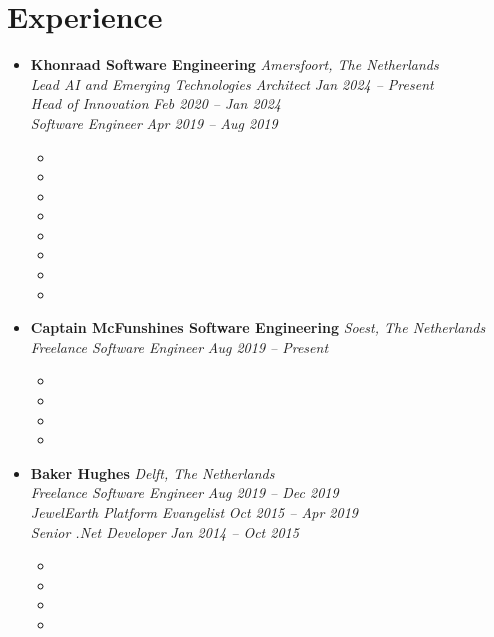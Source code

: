 \documentclass[11pt,a4paper]{article}
\begin{document}
\section{Experience}
\begin{itemize}[leftmargin=0pt,label={},itemsep=2em]  %
\item \textbf{Khonraad Software Engineering} \hfill \textit{Amersfoort, The Netherlands}\\[2pt]
\textit{Lead AI and Emerging Technologies Architect} \hfill \textit{Jan 2024 -- Present}\\[2pt]
\textit{Head of Innovation} \hfill \textit{Feb 2020 -- Jan 2024}\\[2pt]
\textit{Software Engineer} \hfill \textit{Apr 2019 -- Aug 2019}\\[1pt]
\begin{itemize}[leftmargin=*,topsep=0pt,parsep=0pt,partopsep=0pt]
    \item \KhonraadChatbots
    \item \KhonraadLifecycle
    \item \KhonraadMobile
    \item \KhonraadAndroid
    \item \KhonraadMPS
    \item \KhonraadJava
    \item \KhonraadLaws
    \item \KhonraadHaskell
\end{itemize}

\item \textbf{Captain McFunshines Software Engineering} \hfill \textit{Soest, The Netherlands}\\[2pt]
\textit{Freelance Software Engineer} \hfill \textit{Aug 2019 -- Present}\\[1pt]
\begin{itemize}[leftmargin=*,topsep=0pt,parsep=0pt,partopsep=0pt]
    \item \McfunshinePodmorph
    \item \McfunshinePodmorphAI
    \item \McfunshinePodmorphCloud
    \item \McfunshinePodmorphBaker
\end{itemize}

\item \textbf{Baker Hughes} \hfill \textit{Delft, The Netherlands}\\[2pt]
\textit{Freelance Software Engineer} \hfill \textit{Aug 2019 -- Dec 2019}\\[2pt]
\textit{JewelEarth Platform Evangelist} \hfill \textit{Oct 2015 -- Apr 2019}\\[2pt]
\textit{Senior .Net Developer} \hfill \textit{Jan 2014 -- Oct 2015}\\[1pt]
\begin{itemize}[leftmargin=*,topsep=0pt,parsep=0pt,partopsep=0pt]
    \item \BakerEcosystem
    \item \BakerTraining
    \item \BakerConferences
    \item \BakerSupport
\end{itemize}


\end{itemize}
\end{document}
